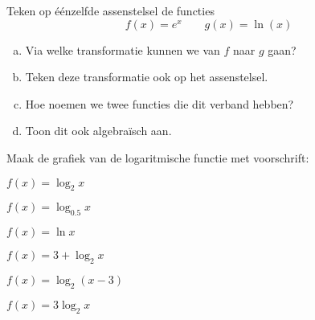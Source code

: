 \documentclass[12pt,twoside]{article}
\begin{document}
\begin{oefening}
Teken op éénzelfde assenstelsel de functies
$$f(x)=e^x\qquad g(x)=\ln(x)$$
\begin{enumerate}[(a)]
  \item Via welke transformatie kunnen we van $f$ naar $g$ gaan?
  \item Teken deze transformatie ook op het assenstelsel.
  \item Hoe noemen we twee functies die dit verband hebben?
  \item Toon dit ook algebraïsch aan.
\end{enumerate}
\end{oefening}

\begin{oefening} %
Maak de grafiek van de logaritmische functie met voorschrift:
\begin{exlist}{3}
  \item $f(x)=\log_2 x$
  \item $f(x)=\log_{0.5}x$
  \item $f(x)=\ln x$
  \item $f(x)=3+\log_2 x$
  \item $f(x)=\log_2(x-3)$
  \item $f(x)=3\log_2 x$
\end{exlist}
\end{oefening}
\end{document}
